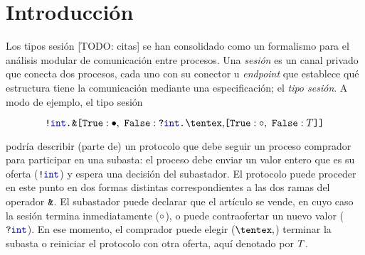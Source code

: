 \section{Introducción}

Los tipos sesión [TODO: citas] se han consolidado como un formalismo para el
análisis modular de comunicación entre procesos. Una \emph{sesión} es un canal
privado que conecta dos procesos, cada uno con su conector u \emph{endpoint} que
establece qué estructura tiene la comunicación mediante una especificación; el
\emph{tipo sesión}. A modo de ejemplo, el tipo sesión

\begin{equation}
    \label{eq:bare.auction}
    \Out\tint{
        \BinaryPBranch[]\tdone{
            \In\tint{
                \BinaryPChoice[]\tend\T
            }
        }
    }
\end{equation}

podría describir (parte de) un protocolo que debe seguir un proceso comprador
para participar en una subasta: el proceso debe enviar un valor entero que es su
oferta ($ \Out [] \tint $) y espera una decisión del subastador. El protocolo
puede proceder en este punto en dos formas distintas correspondientes a las dos
ramas del operador $\texttt{\upshape\&}$. El subastador puede declarar que el
artículo se vende, en cuyo caso la sesión termina inmediatamente ($ {\circ} $), o
puede contraofertar un nuevo valor ($ \In [] \tint $). En ese momento, el
comprador puede elegir ($\Choice$) terminar la subasta o reiniciar
el protocolo con otra oferta, aquí denotado por $T$.
